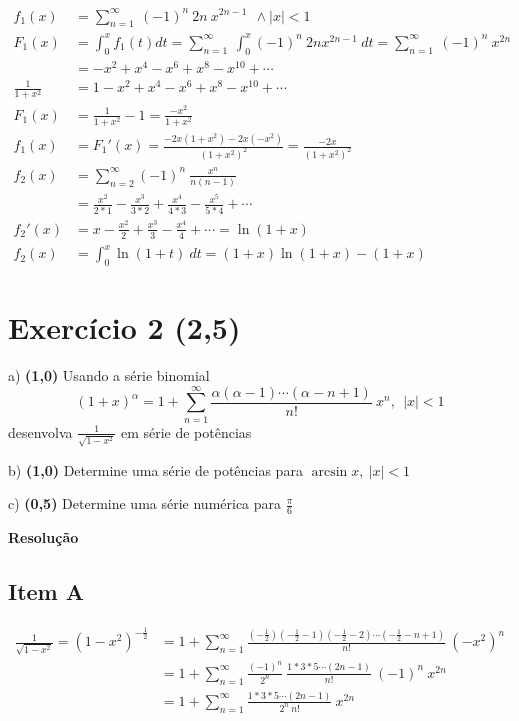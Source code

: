 \documentclass[12pt,openany, letterpaper]{book}
\newcommand{\soma}[2][n]{\sum_{{#1} = #2}^\infty}
\newcommand{\E}[1]{Exercício #1}
\newcommand{\Resolve}{\begin{center} \textbf{Resolução} \end{center}}
\begin{document}
{{\begin{align*}
    f_1(x) &= \soma{1} \ (-1)^n \ 2n\  x^{2n-1}  \ \ \land |x| < 1 \\
    F_1 (x) &= \int_0^x f_1(t) dt = \soma{1} \ \int_0^x (-1)^n \ 2n x^{2n-1} \ dt = \soma{1} \ (-1)^n \ x^{2n} \\
    &= -x^2 + x^4 -x^6 + x^8 - x^{10} + \cdots \\
    \frac{1}{1 + x^2} &= 1 -x^2 + x^4 -x^6 + x^8 - x^{10} + \cdots \\
    F_1 (x) &= \frac{1}{1 + x^2} - 1 = \frac{-x^2}{1+x^2} \\
    f_1(x) &= F_1'(x) = \frac{-2x(1+x^2) - 2x(-x^2)}{(1+x^2)^2} = \frac{-2x}{(1+x^2)^2} \\
    \hline
    f_2(x) &= \soma{2} (-1)^n \ \frac{x^n}{n(n-1)} \\
    &= \frac{x^2}{2*1}-\frac{x^3}{3*2}+\frac{x^4}{4*3}-\frac{x^5}{5*4}+\cdots \\
    f_2'(x) &= x - \frac {x^2}{2} + \frac{x^3}{3} - \frac{x^4}{4} + \cdots = \ln (1+x) \\
    f_2(x) &= \int_0^x \ln (1+t) \ dt = (1+x) \ln (1+x) - (1+x)
\end{align*}


\newpage

\section*{\E{2} (2,5)}

a) \textbf{(1,0)} Usando a série binomial $$(1 + x)^\alpha = 1 + \soma{1} \frac{\alpha(\alpha - 1) \cdots(\alpha - n + 1)}{n!} \ x^n,\ \ |x| <1$$ desenvolva $\displaystyle{\frac{1}{\sqrt{1-x^2}}}$ em série de potências

b) \textbf{(1,0)} Determine uma série de potências para $\arcsin x, \ |x| < 1$

c) \textbf{(0,5)} Determine uma série numérica para $\frac{\pi}{6}$

\Resolve 

\subsection*{Item A} \begin{align*}
    \frac{1}{\sqrt{1-x^2}} = (1-x^2)^{-\frac{1}{2}} &= 1 + \soma{1} \frac{\left(-\frac{1}{2}\right)\left(-\frac{1}{2} - 1\right)\left(-\frac{1}{2} - 2\right)\cdots\left(-\frac{1}{2} - n+1\right)}{n!}\ (-x^2)^n \\
    &= 1 +\soma{1} \frac{(-1)^n}{2^n} \ \frac{1*3*5\cdots(2n-1)}{n!} \ (-1)^n \ x^{2n} \\
    &= 1 +\soma{1} \frac{1*3*5\cdots(2n-1)}{2^n \ n!} \ x^{2n}
\end{align*}

}}
\end{document}
